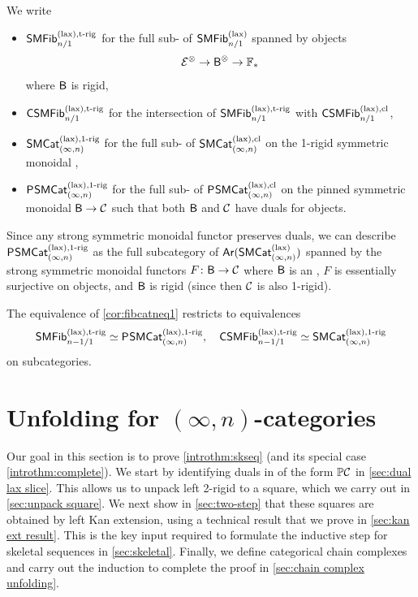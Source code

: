 \documentclass[a4paper,11pt]{article}
\begin{document}
\begin{notation}
  We write
  \begin{itemize}
  \item   $\SMFibpltrig_{n/1}$ for the full sub-\itcat{} of
    $\SMFibpl_{n/1}$ spanned by objects
  \[ \nE^{\otimes} \to \oB^{\otimes} \to \xF_{*}\]
  where $\oB$ is rigid,
\item $\CSMFibpltrig_{n/1}$ for the intersection of
  $\SMFibpltrig_{n/1}$
  with $\CSMFibplcl_{n/1}$,
\item $\SMCatInplorig$ for the
  full sub-\itcat{} of $\SMCatInplcl$ on the 1-rigid symmetric monoidal \incats{},
\item $\PSMCatInplorig$ for the
  full sub-\itcat{} of $\PSMCatInplcl$ on the pinned
  symmetric monoidal \incats{} $\oB \to \nC$ such that both $\oB$ and
  $\nC$ have duals for objects.
  \end{itemize}
\end{notation}

\begin{observation}
  Since any strong symmetric monoidal functor preserves duals, we can
  describe $\PSMCatInplorig$ as the full subcategory of
  $\Ar(\SMCatInpl)$
  spanned by the strong symmetric monoidal functors $F \colon \oB \to \nC$
  where $\oB$ is an \icat{}, $F$ is essentially surjective on
  objects, and $\oB$ is rigid (since then $\nC$ is also 1-rigid).
\end{observation}

\begin{cornoproof}\label{cor:fibeqduals}
  The equivalence of \cref{cor:fibcatneq1} restricts to equivalences
  \[ \SMFibpltrig_{n-1/1} \simeq \PSMCatInplorig,\quad \CSMFibpltrig_{n-1/1} \simeq
    \SMCatInplorig\]
  on subcategories.
\end{cornoproof}

\section{Unfolding for $(\infty,n)$-categories}
\label{sec:unfolding}

Our goal in this section is to prove \cref{introthm:skseq} (and its
special case \cref{introthm:complete}). We start by identifying duals
in \icats{} of the form $\mP\nC$ in \cref{sec:dual lax slice}. This
allows us to unpack left 2-rigid \incats{} to a square, which we carry
out in \cref{sec:unpack square}. We next show in \cref{sec:two-step}
that these squares are obtained by left Kan extension, using a
technical result that we prove in \cref{sec:kan ext result}. This is
the key input required to formulate the inductive step for skeletal
sequences in \cref{sec:skeletal}. Finally, we define categorical chain
complexes and carry out the induction to complete the proof in
\cref{sec:chain complex unfolding}.
\end{document}
